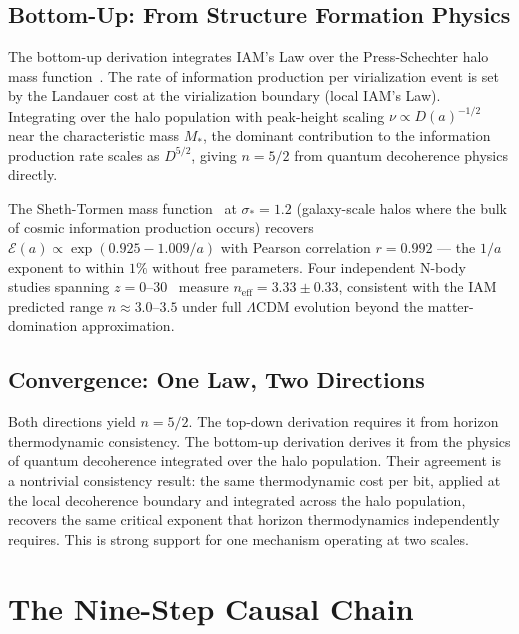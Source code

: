 \documentclass[12pt,a4paper]{article}
\begin{document}
\subsection{Bottom-Up: From Structure Formation Physics}

The bottom-up derivation integrates IAM's Law over the Press-Schechter
halo mass function~\citep{PressSchechter1974}. The rate of
information production per virialization event is set by the Landauer
cost at the virialization boundary (local IAM's Law). Integrating over
the halo population with peak-height scaling $\nu \propto
D(a)^{-1/2}$ near the characteristic mass $M_*$, the dominant
contribution to the information production rate scales as $D^{5/2}$,
giving $n = 5/2$ from quantum decoherence physics directly.

The Sheth-Tormen mass function~\citep{ShethTormen1999} at
$\sigma_* = 1.2$ (galaxy-scale halos where the bulk of cosmic
information production occurs) recovers $\mathcal{E}(a) \propto
\exp(0.925 - 1.009/a)$ with Pearson correlation $r = 0.992$ ---
the $1/a$ exponent to within $1\%$ without free parameters.
Four independent N-body studies spanning
$z = 0$--$30$~\citep{Jenkins2001,Reed2003,Tinker2008,Watson2013}
measure $n_\mathrm{eff} = 3.33 \pm 0.33$, consistent with the IAM
predicted range $n \approx 3.0$--$3.5$ under full $\Lambda$CDM
evolution beyond the matter-domination approximation.

\subsection{Convergence: One Law, Two Directions}

Both directions yield $n = 5/2$. The top-down derivation requires
it from horizon thermodynamic consistency. The bottom-up derivation
derives it from the physics of quantum decoherence integrated over
the halo population. Their agreement is a nontrivial consistency
result: the same thermodynamic cost per bit, applied at the local
decoherence boundary and integrated across the halo population,
recovers the same critical exponent that horizon thermodynamics
independently requires. This is strong support for one mechanism
operating at two scales.

\section{The Nine-Step Causal Chain}
\label{sec:chain}
\end{document}
